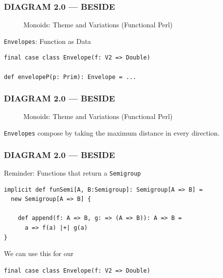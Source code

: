 \documentclass{beamer}
\begin{document}
\begin{frame}[fragile] \frametitle{DIAGRAM 2.0 --- BESIDE}
  \begin{figure}
      \centering
      \caption{Monoids: Theme and Variations (Functional Perl)}
  \end{figure}

  \vspace{-0.5cm}
  \pause

  \begin{block}{\texttt{Envelopes}: Function as Data}
  \begin{lstlisting}
final case class Envelope(f: V2 => Double)

def envelopeP(p: Prim): Envelope = ...
  \end{lstlisting}
  \end{block}
\end{frame}

\begin{frame} \frametitle{DIAGRAM 2.0 --- BESIDE}
  \begin{figure}
      \centering
      \caption{Monoids: Theme and Variations (Functional Perl)}
  \end{figure}

  \texttt{Envelopes} compose by taking the maximum distance in every direction.
\end{frame}


\begin{frame}[fragile] \frametitle{DIAGRAM 2.0 --- BESIDE}
  \begin{block}{Reminder: Functions that return a \texttt{Semigroup}}
  \begin{lstlisting}
implicit def funSemi[A, B:Semigroup]: Semigroup[A => B] =
  new Semigroup[A => B] {

    def append(f: A => B, g: => (A => B)): A => B =
      a => f(a) |+| g(a)
}
  \end{lstlisting}
  \end{block}

  We can use this for our

  \texttt{final case class Envelope(f: V2 => Double)}
\end{frame}
\end{document}
